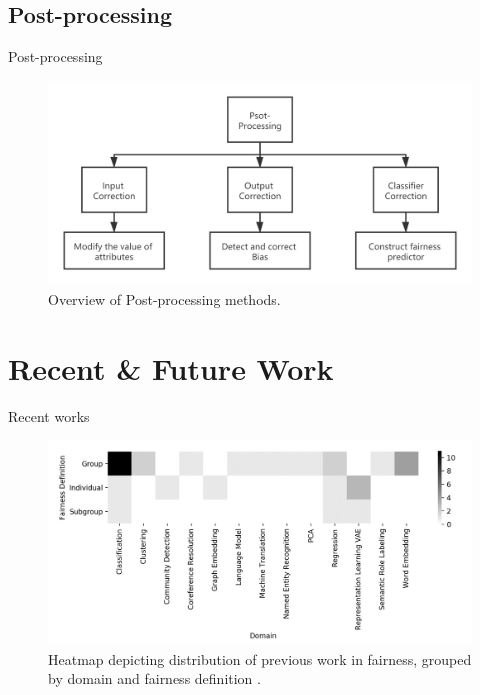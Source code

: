 \documentclass[10pt, xcolor=table,aspectratio=169]{beamer}
\begin{document}
\subsection{Post-processing}

\begin{frame}{Post-processing}
	\begin{figure}[t]
		\begin{center}
			\includegraphics[width=0.8\columnwidth]{./figs/ppm.png}
		\end{center}
		\caption{Overview of Post-processing methods.}
	\end{figure}

\end{frame}



\section{Recent \& Future Work}

\begin{frame}{Recent works}
	\begin{figure}[t]
		\begin{center}
			\includegraphics[width=0.8\columnwidth]{./figs/heatmap.png}
		\end{center}
		\caption{Heatmap depicting distribution of previous work in fairness, grouped by domain and fairness definition \cite{mehrabi2021survey}.}
	\end{figure}
\end{frame}
\end{document}
